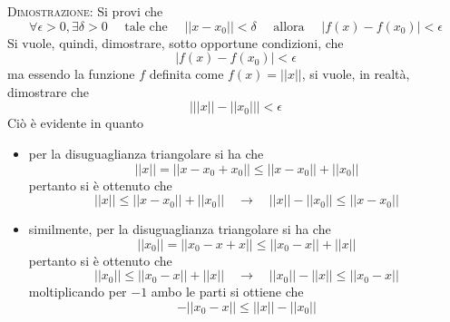 \documentclass[a4paper]{extarticle}
\begin{document}
\vspace{2em}
\noindent
\normalfont \normalsize
\textsc{Dimostrazione}: Si provi che
\[\forall \epsilon > 0, \exists \delta > 0 \hspace{1em} \text{ tale che } \hspace{1em} \left \vert \left \vert x-x_0 \right \vert \right \vert < \delta \hspace{1em} \text{ allora } \hspace{1em} \left \vert f(x)-f(x_0)\right \vert < \epsilon\]
Si vuole, quindi, dimostrare, sotto opportune condizioni, che
\[\left \vert f(x)-f(x_0)\right \vert < \epsilon\]
ma essendo la funzione $f$ definita come $f(x) = \left \vert \left \vert x \right \vert \right \vert$, si vuole, in realtà, dimostrare che
\[\left \vert \left \vert \left \vert x \right \vert \right \vert - \left \vert \left \vert x_0 \right \vert \right \vert \right \vert < \epsilon\]
Ciò è evidente in quanto
\begin{itemize}
    \item per la disuguaglianza triangolare si ha che
    \[\left \vert \left \vert x \right \vert \right \vert = \left \vert \left \vert x-x_0+x_0 \right \vert \right \vert \leq \left \vert \left \vert x-x_0 \right \vert \right \vert + \left \vert \left \vert x_0 \right \vert \right \vert\]
    pertanto si è ottenuto che
    \[\left \vert \left \vert x \right \vert \right \vert \leq \left \vert \left \vert x-x_0 \right \vert \right \vert + \left \vert \left \vert x_0 \right \vert \right \vert \hspace{1em} \rightarrow \hspace{1em} \left \vert \left \vert x \right \vert \right \vert - \left \vert \left \vert x_0 \right \vert \right \vert \leq \left \vert \left \vert x-x_0 \right \vert \right \vert\]

    \item similmente, per la disuguaglianza triangolare si ha che
    \[\left \vert \left \vert x_0 \right \vert \right \vert = \left \vert \left \vert x_0-x+x \right \vert \right \vert \leq \left \vert \left \vert x_0-x \right \vert \right \vert + \left \vert \left \vert x \right \vert \right \vert\]
    pertanto si è ottenuto che
    \[\left \vert \left \vert x_0 \right \vert \right \vert \leq \left \vert \left \vert x_0-x \right \vert \right \vert + \left \vert \left \vert x \right \vert \right \vert \hspace{1em} \rightarrow \hspace{1em} \left \vert \left \vert x_0 \right \vert \right \vert - \left \vert \left \vert x \right \vert \right \vert \leq \left \vert \left \vert x_0-x \right \vert \right \vert\]
    moltiplicando per $-1$ ambo le parti si ottiene che
    \[- \left \vert \left \vert x_0-x \right \vert \right \vert \leq \left \vert \left \vert x \right \vert \right \vert - \left \vert \left \vert x_0 \right \vert \right \vert\]
\end{itemize}
\end{document}
